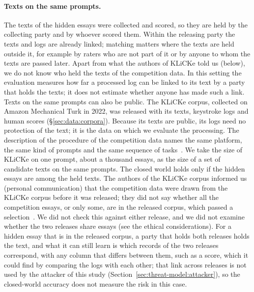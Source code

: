 \paragraph{Texts on the same prompts.}
The texts of the hidden essays were collected and scored, so they are held by the collecting party and by whoever
scored them. Within the releasing party the texts and logs are already linked; matching matters where the texts are
held outside it, for example by raters who are not part of it or by anyone to whom the texts are passed later. Apart
from what the authors of KLiCKe told us (below), we do not know who held the texts of the competition data. In this
setting the evaluation measures how far a processed log can be linked to its text by a party that holds the texts; it
does not estimate whether anyone has made such a link. Texts on the
same prompts can also be public. The KLiCKe corpus, collected on Amazon Mechanical Turk in 2022, was released with its
texts, keystroke logs and human scores (\S\ref{sec:data:corpora}). Because its texts are public, its logs need no
protection of the text; it is the data on which we evaluate the processing. The description of the procedure of the
competition data names the same platform, the same kind of prompts and the same sequence of tasks~\cite{kaggle2023lwp}.
We take the size of KLiCKe on one prompt, about a thousand essays, as the size of a set of candidate texts on the
same prompts. The
closed world holds only if the hidden essays are among the held texts. The authors of the KLiCKe corpus informed us
(personal communication) that the competition data were drawn from the KLiCKe corpus before it was released; they did
not say whether all the competition essays, or only some, are in the released corpus, which passed a
selection~\cite{tian2025klicke}. We did not check this against either release, and we did not examine whether the two
releases share essays (see the ethical considerations). For a hidden essay that is in the released corpus, a party
that holds both releases holds the text, and what it can still learn is which records of the two releases correspond, with any column that differs between them, such as a score,
which it could find by comparing the logs with each other; that link across releases is not used by the attacker of
this study (Section~\ref{sec:threat-model:attacker}), so the closed-world accuracy does not measure the risk in this
case.

